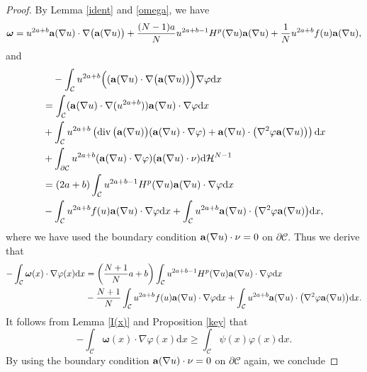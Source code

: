\documentclass[12pt]{amsart}
\theoremstyle{definition}
\theoremstyle{remark}
\theoremstyle{conclusion}
\theoremstyle{conjecture}
\numberwithin{equation}{section}
\begin{document}
\begin{proof}
 By Lemma \ref{ident} and \eqref{omega}, we have
 $$\bm{\omega}=u^{2a+b}{\bf{a}}(\nabla u)\cdot\nabla \big({\bf{a}}(\nabla u)\big)+\frac{(N-1)a}{N}u^{2a+b-1}H^p(\nabla u){\bf{a}}(\nabla u)+\frac{1}{N}u^{2a+b}f(u){\bf{a}}(\nabla u),$$
and
\begin{equation*}
  \begin{aligned}
    &\quad -\int_{\mathcal{C}}u^{2a+b}\Big(({\bf{a}}(\nabla u)\cdot\nabla \big( {\bf{a}}(\nabla u)\big)\Big)\nabla\varphi\mathrm{d}x \\
    &=\int_{\mathcal{C}}({\bf{a}}(\nabla u)\cdot\nabla(u^{2a+b})){\bf{a}}(\nabla u)\cdot\nabla\varphi\mathrm{d}x\\
    &+\int_{\mathcal{C}}u^{2a+b}\left(\operatorname{div}\big({\bf{a}}(\nabla u)\big)({\bf{a}}(\nabla u)\cdot\nabla\varphi)+{\bf{a}}(\nabla u)\cdot\big(\nabla^2\varphi {\bf{a}}(\nabla u)\big)\right) \mathrm{d}x\\
    &+\int_{\partial\mathcal{C}}u^{2a+b}({\bf{a}}(\nabla u)\cdot\nabla\varphi)({\bf{a}}(\nabla u)\cdot\nu)\mathrm{d}\mathcal{H}^{N-1}\\
    &=(2a+b)\int_{\mathcal{C}}u^{2a+b-1}H^p(\nabla u){\bf{a}}(\nabla u)\cdot\nabla\varphi\mathrm{d}x\\
    &-\int_{\mathcal{C}}u^{2a+b}f( u){\bf{a}}(\nabla u)\cdot\nabla\varphi\mathrm{d}x+\int_{\mathcal{C}}u^{2a+b}{\bf{a}}(\nabla u)\cdot\big(\nabla^2\varphi {\bf{a}}(\nabla u)\big)\mathrm{d}x,
  \end{aligned}
\end{equation*}
where we have used the boundary condition ${\bf{a}}(\nabla u)\cdot\nu=0$ on $\partial\mathcal{C}$. Thus we derive that
\begin{equation*}
  \begin{aligned}
    - \int_{\mathcal{C}}\bm{\omega}(x)\cdot\nabla\varphi(x)\mathrm{d}x
    &=\left(\frac{N+1}{N}a+b\right)\int_{\mathcal{C}}u^{2a+b-1}H^p(\nabla u){\bf{a}}(\nabla u)\cdot\nabla\varphi\mathrm{d}x\\
    &-\frac{N+1}{N}\int_{\mathcal{C}}u^{2a+b}f( u){\bf{a}}(\nabla u)\cdot\nabla\varphi\mathrm{d}x+\int_{\mathcal{C}}u^{2a+b}{\bf{a}}(\nabla u)\cdot\big(\nabla^2\varphi {\bf{a}}(\nabla u)\big)\mathrm{d}x.
  \end{aligned}
\end{equation*}
It follows from Lemma \ref{I(x)} and Proposition \ref{key} that
$$- \int_{\mathcal{C}}\bm{\omega}(x)\cdot\nabla\varphi(x)\mathrm{d}x\geq\int_{\mathcal{C}}\psi(x)\varphi(x)\mathrm{d}x.$$
By using the boundary condition ${\bf{a}}(\nabla u)\cdot\nu=0$ on $\partial\mathcal{C}$ again, we conclude

\end{proof}
\end{document}
